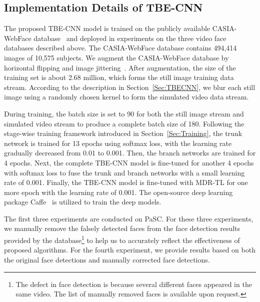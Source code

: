 \documentclass[10pt,journal,cspaper,compsoc]{IEEEtran}
\begin{document}
\subsection{Implementation Details of TBE-CNN}
The proposed TBE-CNN model is trained on the publicly available CASIA-WebFace database~\cite{yi2014learning} and deployed in experiments on the three video face databases described above.
The CASIA-WebFace database contains 494,414 images of 10,575 subjects.
We augment the CASIA-WebFace database by horizontal flipping and image jittering~\cite{ding2015robust}.
After augmentation, the size of the training set is about 2.68 million, which forms the still image training data stream.
According to the description in Section~\ref{Sec:TBECNN}, we blur each still image using a randomly chosen kernel to form the simulated video data stream.

During training, the batch size is set to 90 for both the still image stream and simulated video stream to produce a complete batch size of 180.
Following the stage-wise training framework introduced in Section~\ref{Sec:Training},
the trunk network is trained for 13 epochs using softmax loss, with the learning rate gradually decreased from 0.01 to 0.001.
Then, the branch networks are trained for 4 epochs.
Next, the complete TBE-CNN model is fine-tuned for another 4 epochs with softmax loss to fuse the trunk and branch networks with a small learning rate of 0.001.
Finally, the TBE-CNN model is fine-tuned with MDR-TL for one more epoch with the learning rate of 0.001.
The open-source deep learning package Caffe~\cite{jia2014caffe} is utilized to train the deep models.

The first three experiments are conducted on PaSC. For these three experiments,
we manually remove the falsely detected faces from the face detection results provided by the database\footnote{The defect in face detection is because several different faces appeared in the same video. The list of manually removed faces is available upon request.}
to help us to accurately reflect the effectiveness of proposed algorithms.
For the fourth experiment, we provide results based on both the original face detections and manually corrected face detections.
\end{document}
